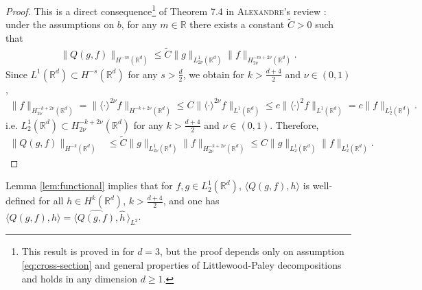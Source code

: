 \documentclass[11pt,a4paper,reqno]{amsart}
\theoremstyle{plain}
\theoremstyle{definition}
\begin{document}
\begin{proof}
This is a direct consequence\footnote{This result is proved in \cite{Ale09} for $d=3$, but the proof depends only on assumption \eqref{eq:cross-section} and general properties of Littlewood-Paley decompositions and holds in any dimension $d\ge 1$.} of Theorem 7.4 in \textsc{Alexandre}'s review \cite{Ale09}: under the assumptions on $b$, for any $m\in{\mathbb{R}}$ there exists a constant $\widetilde{C}>0$ such that
\begin{align*}
	\|Q(g,f)\|_{H^{-m}({\mathbb{R}}^d)} \leq \widetilde{C} \|g\|_{L^1_{2\nu}({\mathbb{R}}^d)} \| f\|_{H^{-m+2\nu}_{2\nu}({\mathbb{R}}^d)}.
\end{align*}
Since $L^1({\mathbb{R}}^d)\subset H^{-s}({\mathbb{R}}^d)$ for any $s>\frac{d}{2}$, we obtain for $k>\frac{d+4}{2}$ and $\nu\in(0,1)$,
\begin{align*}
\|f\|_{H^{-k+2\nu}_{2\nu}({\mathbb{R}}^d)} = \|\langle \cdot\rangle^{2\nu} f \|_{H^{-k+2\nu}({\mathbb{R}}^d)} \leq C \|\langle \cdot\rangle^{2\nu} f\|_{L^1({\mathbb{R}}^d)} \leq c \|\langle \cdot\rangle^{2} f\|_{L^1({\mathbb{R}}^d)} = c\|f\|_{L^1_2({\mathbb{R}}^d)}.
\end{align*}
i.e. $L^1_{2}({\mathbb{R}}^d) \subset H^{-k+2\nu}_{2\nu}({\mathbb{R}}^d)$ for any $k>\tfrac{d+4}{2}$ and $\nu\in (0,1)$.
Therefore,
\begin{align*}
	\|Q(g,f)\|_{H^{-k}({\mathbb{R}}^d)} &\leq \widetilde{C} \|g\|_{L^1_{2\nu}({\mathbb{R}}^d)} \|f\|_{H^{-k+2\nu}_{2\nu}({\mathbb{R}}^d)} \leq C \|g\|_{L^1_{2}({\mathbb{R}}^d)} \|f\|_{L^1_2({\mathbb{R}}^d)}. 
\end{align*}
\end{proof}

Lemma \ref{lem:functional} implies that for $f,g\in L^1_2({\mathbb{R}}^d)$, $\langle Q(g,f), h \rangle$ is well-defined for all $h\in H^k({\mathbb{R}}^d)$, $k>\frac{d+4}{2}$, and one has $\langle Q(g,f), h \rangle  = \langle \widehat{Q(g,f)}, \widehat{h} \,\rangle_{L^2}$.
\end{document}

